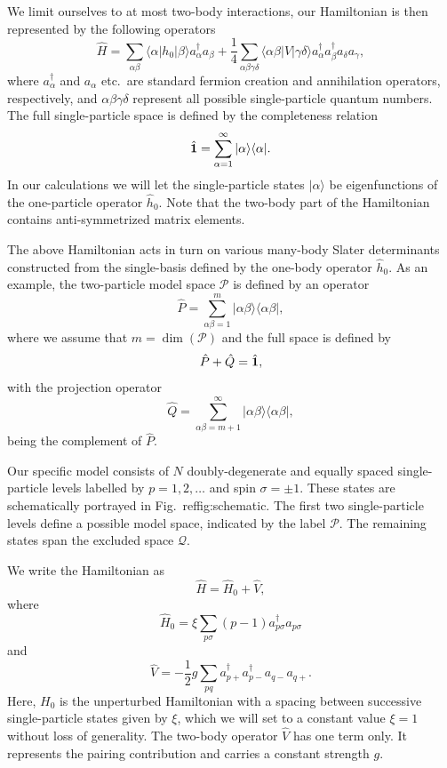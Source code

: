 \documentclass[%
twoside,                 %
final,                   %
10pt]{article}
\begin{document}
We limit ourselves to at most two-body interactions, our Hamiltonian
is then represented by the following operators
\[
\hat{H} = \sum_{\alpha\beta}\langle \alpha |h_0|\beta\rangle
a_{\alpha}^{\dagger}a_{\beta}
+\frac{1}{4}\sum_{\alpha\beta\gamma\delta}\langle \alpha\beta|
V|\gamma\delta\rangle
a_{\alpha}^{\dagger}a_{\beta}^{\dagger}a_{\delta}a_{\gamma},
\]
where $a_{\alpha}^{\dagger}$ and $a_{\alpha}$ etc.~are standard
fermion creation and annihilation operators, respectively, and
$\alpha\beta\gamma\delta$ represent all possible single-particle
quantum numbers.  The full single-particle space is defined by the
completeness relation 
\[
\hat{{\bf 1}} = \sum_{\alpha=1}^{\infty}|\alpha \rangle \langle \alpha|.
\]
In our calculations
we will let the single-particle states $|\alpha\rangle$ be
eigenfunctions of the one-particle operator $\hat{h}_0$. Note that the two-body part of the Hamiltonian 
contains anti-symmetrized matrix elements.


The above Hamiltonian acts in turn on various many-body Slater
determinants constructed from the single-basis defined by the one-body
operator $\hat{h}_0$.  As an example, the two-particle model space
$\mathcal{P}$ is defined by an operator
\[
\hat{P} = \sum_{\alpha\beta =1}^{m}|\alpha\beta \rangle \langle
\alpha\beta|,
\]
where we assume that $m=\dim(\mathcal{P})$ and the full space is
defined by
\[
\hat{P}+\hat{Q}=\hat{{\bf 1}},
\]
with the projection operator
\[
\hat{Q} = \sum_{\alpha\beta =m+1}^{\infty}|\alpha\beta \rangle \langle
\alpha\beta|,
\]
being the complement of $\hat{P}$.


Our specific model consists of $N$ doubly-degenerate and equally
spaced single-particle levels labelled by $p=1,2,\dots$ and spin
$\sigma=\pm 1$.  These states are schematically portrayed in
Fig.~ref{fig:schematic}.  The first two single-particle levels define
a possible model space, indicated by the label $\mathcal{P}$.  The
remaining states span the excluded space $\mathcal{Q}$.

We write the Hamiltonian as
\[ \hat{H} = \hat{H}_0 + \hat{V} , \]
where
\[
\hat{H}_0=\xi\sum_{p\sigma}(p-1)a_{p\sigma}^{\dagger}a_{p\sigma}
\]
and
\[
\hat{V}=-\frac{1}{2}g\sum_{pq}a^{\dagger}_{p+}
a^{\dagger}_{p-}a_{q-}a_{q+}.
\]
Here, $H_0$ is the unperturbed Hamiltonian with a spacing between
successive single-particle states given by $\xi$, which we will set to
a constant value $\xi=1$ without loss of generality. The two-body
operator $\hat{V}$ has one term only. It represents the pairing
contribution and carries a constant strength $g$.
\end{document}
